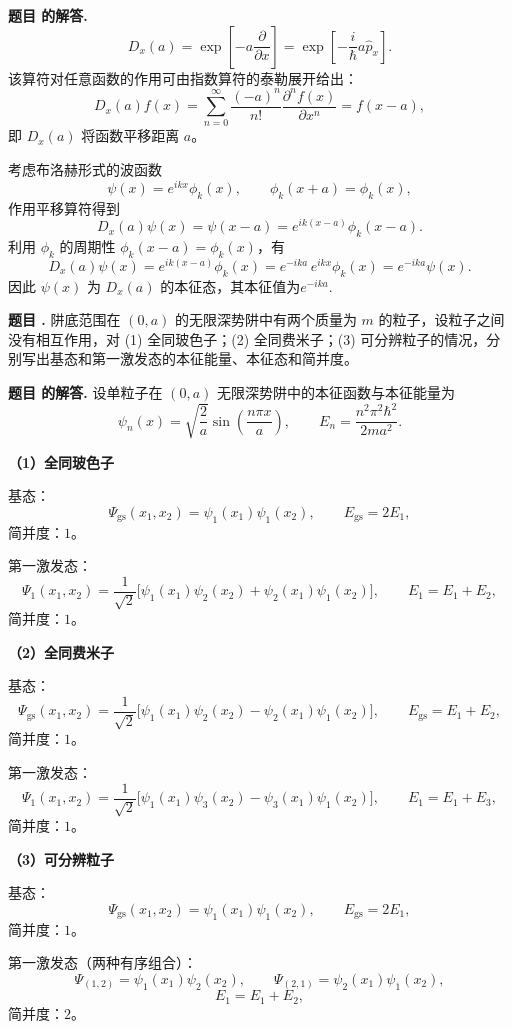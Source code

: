 \documentclass[12pt, a4paper, oneside]{ctexart}
\newcounter{problemname}
\newenvironment{problem}
  {\begin{shaded}\stepcounter{problemname}\par\noindent\textbf{题目 \theproblemname. }}
  {\end{shaded}\par}
\newenvironment{solution}
  {\par\noindent\textbf{题目 \theproblemname 的解答. }}
  {\par}
\begin{document}
\begin{solution}
  \[
D_x(a)=\exp\!\left[-a\frac{\partial}{\partial x}\right]
=\exp\!\left[-\frac{i}{\hbar}a\hat p_x\right].
\]
该算符对任意函数的作用可由指数算符的泰勒展开给出：
\[
D_x(a)f(x)=\sum_{n=0}^{\infty}\frac{(-a)^n}{n!}\frac{\partial^n f(x)}{\partial x^n}
=f(x-a),
\]
即 $D_x(a)$ 将函数平移距离 $a$。

考虑布洛赫形式的波函数
\[
\psi(x)=e^{ikx}\phi_k(x), \qquad \phi_k(x+a)=\phi_k(x),
\]
作用平移算符得到
\[
D_x(a)\psi(x)=\psi(x-a)
=e^{ik(x-a)}\phi_k(x-a).
\]
利用 $\phi_k$ 的周期性 $\phi_k(x-a)=\phi_k(x)$，有
\[
D_x(a)\psi(x)
=e^{ik(x-a)}\phi_k(x)
=e^{-ika}\,e^{ikx}\phi_k(x)
=e^{-ika}\psi(x).
\]
因此 $\psi(x)$ 为 $D_x(a)$ 的本征态，其本征值为$e^{-ika}$.
\end{solution}
\begin{problem}
  阱底范围在 $(0, a)$ 的无限深势阱中有两个质量为 $m$ 的粒子，设粒子之间没有相互作用，对 (1) 全同玻色子；(2) 全同费米子；(3) 可分辨粒子的情况，分别写出基态和第一激发态的本征能量、本征态和简并度。
\end{problem}
\begin{solution}
  设单粒子在 $(0,a)$ 无限深势阱中的本征函数与本征能量为
\[
\psi_n(x)=\sqrt{\frac{2}{a}}\sin\!\left(\frac{n\pi x}{a}\right),\qquad
E_n=\frac{n^2\pi^2\hbar^2}{2ma^2}.
\]

\noindent\textbf{（1）全同玻色子}

基态：
\[
\Psi_{\mathrm{gs}}(x_1,x_2)=\psi_1(x_1)\psi_1(x_2),\qquad
E_{\mathrm{gs}}=2E_1,
\]
简并度：$1$。

第一激发态：
\[
\Psi_{1}(x_1,x_2)=\frac{1}{\sqrt{2}}\big[\psi_1(x_1)\psi_2(x_2)+\psi_2(x_1)\psi_1(x_2)\big],
\qquad E_1=E_1+E_2,
\]
简并度：$1$。

\bigskip

\noindent\textbf{（2）全同费米子}

基态：
\[
\Psi_{\mathrm{gs}}(x_1,x_2)=\frac{1}{\sqrt{2}}\big[\psi_1(x_1)\psi_2(x_2)-\psi_2(x_1)\psi_1(x_2)\big],\qquad
E_{\mathrm{gs}}=E_1+E_2,
\]
简并度：$1$。

第一激发态：
\[
\Psi_1(x_1,x_2)=\frac{1}{\sqrt{2}}\big[\psi_1(x_1)\psi_3(x_2)-\psi_3(x_1)\psi_1(x_2)\big],\qquad
E_1=E_1+E_3,
\]
简并度：$1$。

\bigskip

\noindent\textbf{（3）可分辨粒子}

基态：
\[
\Psi_{\mathrm{gs}}(x_1,x_2)=\psi_1(x_1)\psi_1(x_2),\qquad
E_{\mathrm{gs}}=2E_1,
\]
简并度：$1$。

第一激发态（两种有序组合）：
\[
\Psi_{(1,2)}=\psi_1(x_1)\psi_2(x_2),\qquad
\Psi_{(2,1)}=\psi_2(x_1)\psi_1(x_2),
\]
\[
E_1=E_1+E_2,
\]
简并度：$2$。
\end{solution}
\end{document}
